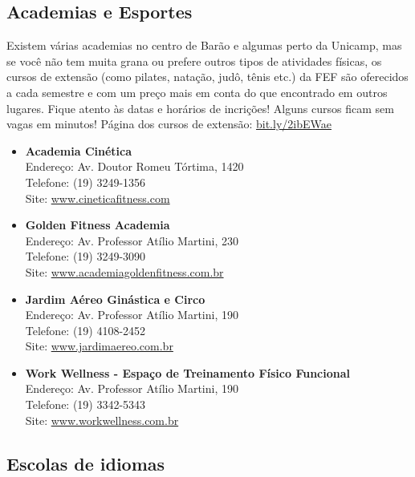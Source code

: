 \subsection{Academias e Esportes}

Existem várias academias no centro de Barão e algumas perto da Unicamp, mas se
você não tem muita grana ou prefere outros tipos de atividades físicas, os
cursos de extensão (como pilates, natação, judô, tênis etc.) da FEF são
oferecidos a cada semestre e com um preço mais em conta do que encontrado em
outros lugares. Fique atento às datas e horários de incrições! Alguns cursos
ficam sem vagas em minutos! Página dos cursos de extensão: \url{bit.ly/2ibEWae}

\begin{itemize}
\item \textbf{Academia Cinética}
  \\Endereço: Av. Doutor Romeu Tórtima, 1420
  \\Telefone: (19) 3249-1356
  \\Site: \url{www.cineticafitness.com}

\item \textbf{Golden Fitness Academia}
  \\Endereço: Av. Professor Atílio Martini, 230
  \\Telefone: (19) 3249-3090
  \\Site: \url{www.academiagoldenfitness.com.br}

\item \textbf{Jardim Aéreo Ginástica e Circo}
  \\Endereço: Av. Professor Atílio Martini, 190
  \\Telefone: (19) 4108-2452
  \\Site: \url{www.jardimaereo.com.br}

\item \textbf{Work Wellness - Espaço de Treinamento Físico Funcional}
  \\Endereço: Av. Professor Atílio Martini, 190
  \\Telefone: (19) 3342-5343
  \\Site: \url{www.workwellness.com.br}
\end{itemize}

\subsection{Escolas de idiomas}

